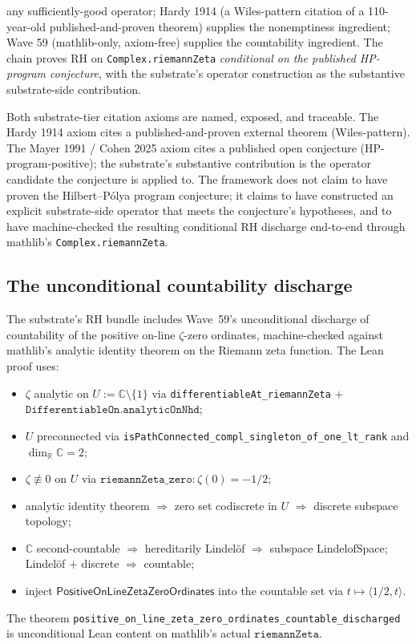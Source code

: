 \documentclass[11pt,a4paper]{amsart}
\theoremstyle{plain}
\theoremstyle{definition}
\begin{document}
\begin{description}[font=\normalfont\bfseries,leftmargin=2em,itemsep=4pt]
any sufficiently-good operator; Hardy 1914 (a Wiles-pattern citation of a 110-year-old published-and-proven theorem) supplies the nonemptiness ingredient; Wave 59 (mathlib-only, axiom-free) supplies the countability ingredient. The chain proves RH on \texttt{Complex.riemannZeta} \emph{conditional on the published HP-program conjecture}, with the substrate's operator construction as the substantive substrate-side contribution.
\end{description}

Both substrate-tier citation axioms are named, exposed, and traceable. The Hardy 1914 axiom cites a published-and-proven external theorem (Wiles-pattern). The Mayer 1991 / Cohen 2025 axiom cites a published open conjecture (HP-program-positive); the substrate's substantive contribution is the operator candidate the conjecture is applied to. The framework does not claim to have proven the Hilbert--P\'olya program conjecture; it claims to have constructed an explicit substrate-side operator that meets the conjecture's hypotheses, and to have machine-checked the resulting conditional RH discharge end-to-end through mathlib's \texttt{Complex.riemannZeta}.

\subsection{The unconditional countability discharge}

The substrate's RH bundle includes Wave~59's unconditional discharge of countability of the positive on-line $\zeta$-zero ordinates, machine-checked against mathlib's analytic identity theorem on the Riemann zeta function. The Lean proof uses:
\begin{itemize}[itemsep=2pt]
\item $\zeta$ analytic on $U := \mathbb{C}\setminus\{1\}$ via \texttt{differentiableAt\_riemannZeta} + $\texttt{DifferentiableOn.analyticOnNhd}$;
\item $U$ preconnected via \texttt{isPathConnected\_compl\_singleton\_of\_one\_lt\_rank} and $\dim_{\mathbb{R}}\mathbb{C} = 2$;
\item $\zeta \not\equiv 0$ on $U$ via $\texttt{riemannZeta\_zero} : \zeta(0) = -1/2$;
\item analytic identity theorem $\Rightarrow$ zero set codiscrete in $U$ $\Rightarrow$ discrete subspace topology;
\item $\mathbb{C}$ second-countable $\Rightarrow$ hereditarily Lindel\"of $\Rightarrow$ subspace LindelofSpace; Lindel\"of + discrete $\Rightarrow$ countable;
\item inject $\textsf{PositiveOnLineZetaZeroOrdinates}$ into the countable set via $t \mapsto \langle 1/2, t\rangle$.
\end{itemize}
The theorem \texttt{positive\_on\_line\_zeta\_zero\_ordinates\_countable\_discharged} is unconditional Lean content on mathlib's actual $\texttt{riemannZeta}$.
\end{document}
